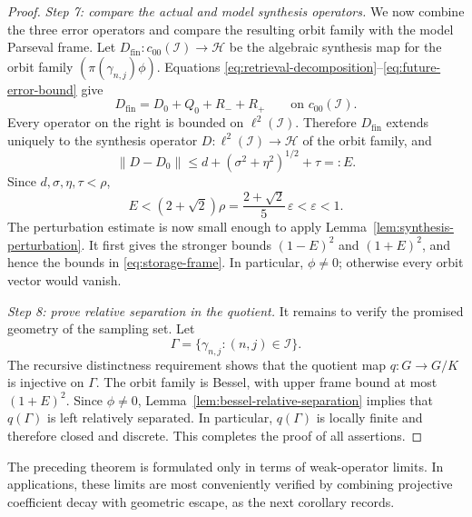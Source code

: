 \documentclass[10pt,a4paper]{amsart}
\numberwithin{equation}{section}
\newcommand{\cH}{\mathcal H}
\newcommand{\cI}{\mathcal I}
\newcommand{\Step}[1]{\par\medskip\noindent\textit{#1.}\quad}
\begin{document}
\begin{proof}
\Step{Step 7: compare the actual and model synthesis operators}
We now combine the three error operators and compare the resulting orbit
family with the model Parseval frame.  Let
$D_{\mathrm{fin}}:c_{00}(\cI)\to\cH$ be the algebraic synthesis map for the
orbit family $(\pi(\gamma_{n,j})\phi)$.  Equations
\eqref{eq:retrieval-decomposition}--\eqref{eq:future-error-bound} give
\begin{equation}\label{eq:synthesis-decomposition}
 D_{\mathrm{fin}}=D_0+Q_0+R_-+R_+
 \qquad\text{on }c_{00}(\cI).
\end{equation}
Every operator on the right is bounded on $\ell^2(\cI)$.  Therefore
$D_{\mathrm{fin}}$ extends uniquely to the synthesis operator
$D:\ell^2(\cI)\to\cH$ of the orbit family, and
\begin{equation}\label{eq:total-error}
 \|D-D_0\|
 \leq d+(\sigma^2+\eta^2)^{1/2}+\tau=:E.
\end{equation}
Since $d,\sigma,\eta,\tau<\rho$,
\begin{equation}\label{eq:error-budget-final}
 E<(2+\sqrt2)\rho
   =\frac{2+\sqrt2}{5}\,\varepsilon
   <\varepsilon<1.
\end{equation}
The perturbation estimate is now small enough to apply
Lemma~\ref{lem:synthesis-perturbation}.  It first gives the stronger bounds
$(1-E)^2$ and $(1+E)^2$, and hence the bounds in \eqref{eq:storage-frame}.
In particular, $\phi\neq0$; otherwise every orbit vector would vanish.

\Step{Step 8: prove relative separation in the quotient}
It remains to verify the promised geometry of the sampling set.  Let
\[
 \Gamma=\{\gamma_{n,j}:(n,j)\in\cI\}.
\]
The recursive distinctness requirement shows that the quotient map
$q:G\to G/K$ is injective on $\Gamma$.  The orbit family is Bessel, with
upper frame bound at most $(1+E)^2$.  Since $\phi\neq0$,
Lemma~\ref{lem:bessel-relative-separation} implies that $q(\Gamma)$ is left
relatively separated.  In particular, $q(\Gamma)$ is locally finite and
therefore closed and discrete.  This completes the proof of all assertions.
\end{proof}

The preceding theorem is formulated only in terms of weak-operator limits.
In applications, these limits are most conveniently verified by combining
projective coefficient decay with geometric escape, as the next corollary
records.
\end{document}
